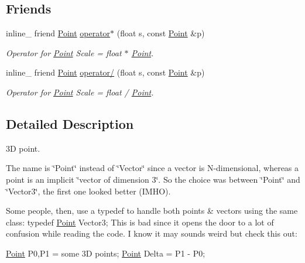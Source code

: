 \subsection*{Friends}
\begin{DoxyCompactItemize}
\item 
\hypertarget{class_point_a9ff6f894ad3fd6ffe459481cef490d8f}{inline\+\_\+ friend \hyperlink{class_point}{Point} \hyperlink{class_point_a9ff6f894ad3fd6ffe459481cef490d8f}{operator$\ast$} (float s, const \hyperlink{class_point}{Point} \&p)}\label{class_point_a9ff6f894ad3fd6ffe459481cef490d8f}

\begin{DoxyCompactList}\small\item\em Operator for \hyperlink{class_point}{Point} Scale = float $\ast$ \hyperlink{class_point}{Point}. \end{DoxyCompactList}\item 
\hypertarget{class_point_a701c7cd1827352be21328ffe9021fec3}{inline\+\_\+ friend \hyperlink{class_point}{Point} \hyperlink{class_point_a701c7cd1827352be21328ffe9021fec3}{operator/} (float s, const \hyperlink{class_point}{Point} \&p)}\label{class_point_a701c7cd1827352be21328ffe9021fec3}

\begin{DoxyCompactList}\small\item\em Operator for \hyperlink{class_point}{Point} Scale = float / \hyperlink{class_point}{Point}. \end{DoxyCompactList}\end{DoxyCompactItemize}


\subsection{Detailed Description}
3\+D point.

The name is \char`\"{}\+Point\char`\"{} instead of \char`\"{}\+Vector\char`\"{} since a vector is N-\/dimensional, whereas a point is an implicit \char`\"{}vector of dimension 3\char`\"{}. So the choice was between \char`\"{}\+Point\char`\"{} and \char`\"{}\+Vector3\char`\"{}, the first one looked better (I\+M\+H\+O).

Some people, then, use a typedef to handle both points \& vectors using the same class\+: typedef \hyperlink{class_point}{Point} Vector3; This is bad since it opens the door to a lot of confusion while reading the code. I know it may sounds weird but check this out\+:


\begin{DoxyCode}
\hyperlink{class_point}{Point} P0,P1 = some 3D points;
\hyperlink{class_point}{Point} Delta = P1 - P0;
\end{DoxyCode}



